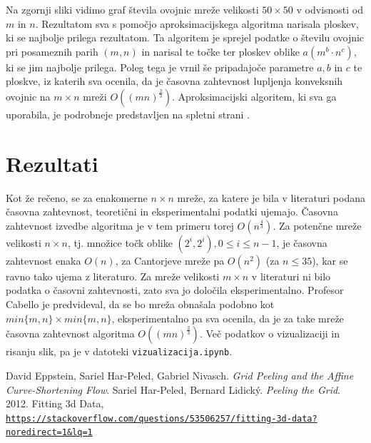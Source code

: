 \documentclass[a4paper]{article}
\begin{document}
Na zgornji sliki vidimo graf števila ovojnic mreže velikosti $50 \times 50$ v odvisnosti od $m$ in $n$. Rezultatom sva s pomočjo aproksimacijskega algoritma narisala ploskev, ki se najbolje
prilega rezultatom. Ta algoritem je sprejel podatke o številu ovojnic pri posameznih parih $(m, n)$ in narisal te točke ter ploskev oblike $a(m^b \cdot n^c)$, ki se jim najbolje prilega.
Poleg tega je vrnil še pripadajoče parametre $a, b$ in $c$ te ploskve, iz katerih sva ocenila, da je časovna zahtevnost lupljenja konveksnih ovojnic na $m \times n$ mreži 
$O((mn)^{\frac{2}{3}})$. Aproksimacijski algoritem, ki sva ga uporabila, je podrobneje predstavljen na spletni strani \cite{aproksimacija}.

\section{Rezultati}
Kot že rečeno, se za enakomerne $n \times n$ mreže, za katere je bila v literaturi podana časovna zahtevnost, teoretični in eksperimentalni podatki ujemajo. Časovna zahtevnost izvedbe algoritma
je v tem primeru torej $O(n ^ \frac{4}{3})$. Za potenčne mreže velikosti $n \times n$, tj. množice točk oblike $(2^i, 2^i), 0 \leq i \leq n - 1$, je časovna zahtevnost enaka
$O(n)$, za Cantorjeve mreže pa $O(n^2)$ (za $n \leq 35$), kar se ravno tako ujema z literaturo.
Za mreže velikosti $m \times n$ v literaturi ni bilo podatka o časovni zahtevnosti, zato sva jo določila eksperimentalno. Profesor Cabello je predvideval,
da se bo mreža obnašala podobno kot $min\{m,n\}\times min\{m,n\}$, eksperimentalno
pa sva ocenila, da je za take mreže časovna zahtevnost algoritma $O((mn)^{\frac{2}{3}})$. Več podatkov o vizualizaciji in risanju slik, pa je v datoteki \texttt{vizualizacija.ipynb}.

\begin{thebibliography}{3}
    David Eppstein, Sariel Har-Peled, Gabriel Nivasch. \textit{Grid Peeling and the Affine Curve-Shortening Flow}.
    Sariel Har-Peled, Bernard Lidický. \textit{Peeling the Grid}. 2012.
    Fitting 3d Data, \\\href{https://stackoverflow.com/questions/53506257/fitting-3d-data?noredirect=1&lq=1}
    {\texttt{https://stackoverflow.com/questions/53506257/fitting-3d-data?noredirect=1\&lq=1}}
\end{thebibliography}
\end{document}
